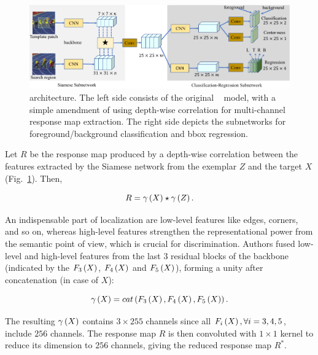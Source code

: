 \begin{figure}[t]
    \centerline{\includegraphics[width=\linewidth]{figures/theoretical_foundations/siamcar_architecture.pdf}}
    \caption[ architecture]{ architecture. The left side consists of the original ~\cite{Bertinetto2016} model, with a simple amendment of using depth-wise correlation for multi-channel response map extraction. The right side depicts the subnetworks for foreground/background classification and \gls{bbox} regression. }
    \label{fig:SiamCARArchitecture}
\end{figure}

Let $R$ be the response map produced by a depth-wise correlation between the features extracted by the Siamese network from the exemplar $Z$ and the target $X$ (Fig.~\ref{fig:SiamCARArchitecture}). Then,

\begin{equation}
    R = {\gamma} \left( X \right) \star {\gamma} \left( Z \right).
\end{equation}

\noindent An indispensable part of localization are low-level features like edges, corners, and so on, whereas high-level features strengthen the representational power from the semantic point of view, which is crucial for discrimination. Authors fused low-level and high-level features from the last $3$ residual blocks of the  backbone (indicated by the ${F_3} \left( X \right)$, ${F_4} \left( X \right)$ and ${F_5} \left( X \right)$), forming a unity after concatenation (in case of $X$):

\begin{equation}
    {\gamma} \left( X \right) = {cat} \left( {F_3} \left( X \right), {F_4} \left( X \right), {F_5} \left( X \right) \right).
\end{equation}

\noindent The resulting ${\gamma} \left( X \right)$ contains $3 \times 255$ channels since all ${F_i} \left( X \right), \forall i = 3, 4, 5$, include $256$ channels. The response map $R$ is then convoluted with $1 \times 1$ kernel to reduce its dimension to $256$ channels, giving the reduced response map $R^*$.

